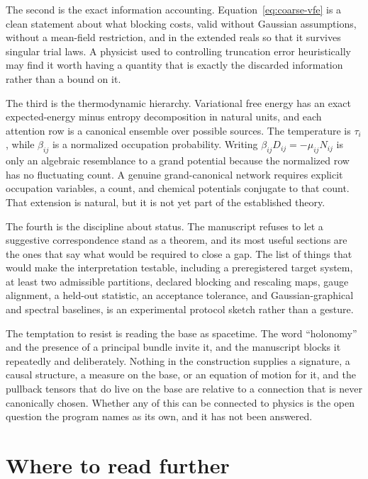 \documentclass[11pt,letterpaper]{article}
\begin{document}
The second is the exact information accounting. Equation~\eqref{eq:coarse-vfe} is a clean statement about what blocking costs, valid without Gaussian assumptions, without a mean-field restriction, and in the extended reals so that it survives singular trial laws. A physicist used to controlling truncation error heuristically may find it worth having a quantity that is exactly the discarded information rather than a bound on it.

The third is the thermodynamic hierarchy. Variational free energy has an exact expected-energy minus entropy decomposition in natural units, and each attention row is a canonical ensemble over possible sources. The temperature is \(\tau_i\), while \(\beta_{ij}\) is a normalized occupation probability. Writing \(\beta_{ij}D_{ij}=-\mu_{ij}N_{ij}\) is only an algebraic resemblance to a grand potential because the normalized row has no fluctuating count. A genuine grand-canonical network requires explicit occupation variables, a count, and chemical potentials conjugate to that count. That extension is natural, but it is not yet part of the established theory.

The fourth is the discipline about status. The manuscript refuses to let a suggestive correspondence stand as a theorem, and its most useful sections are the ones that say what would be required to close a gap. The list of things that would make the interpretation testable, including a preregistered target system, at least two admissible partitions, declared blocking and rescaling maps, gauge alignment, a held-out statistic, an acceptance tolerance, and Gaussian-graphical and spectral baselines, is an experimental protocol sketch rather than a gesture.

The temptation to resist is reading the base as spacetime. The word ``holonomy'' and the presence of a principal bundle invite it, and the manuscript blocks it repeatedly and deliberately. Nothing in the construction supplies a signature, a causal structure, a measure on the base, or an equation of motion for it, and the pullback tensors that do live on the base are relative to a connection that is never canonically chosen. Whether any of this can be connected to physics is the open question the program names as its own, and it has not been answered.

\section{Where to read further}
\end{document}
